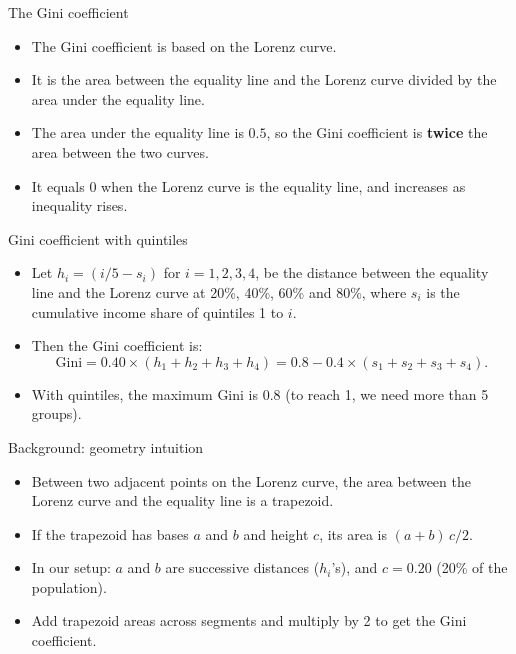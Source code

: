 \documentclass[aspectratio=169]{beamer}
\begin{document}
\begin{frame}{The Gini coefficient}
\transfade
\begin{itemize}
\item The Gini coefficient is based on the Lorenz curve.
\item It is the area between the equality line and the Lorenz curve divided by the area under the equality line.
\item The area under the equality line is $0.5$, so the Gini coefficient is \textbf{twice} the area between the two curves.
\item It equals 0 when the Lorenz curve is the equality line, and increases as inequality rises.
\end{itemize}
\end{frame}

\begin{frame}{Gini coefficient with quintiles}
\transfade
\begin{itemize}
\item Let $h_i=(i/5-s_i)$ for $i=1,2,3,4$, be the distance between the equality line and the Lorenz curve at 20\%, 40\%, 60\% and 80\%, where $s_i$ is the cumulative income share of quintiles 1 to $i$.
\item Then the Gini coefficient is:
\[
\text{Gini} = 0.40 \times (h_1+h_2+h_3+h_4) = 0.8-0.4\times(s_1+s_2+s_3+s_4).
\]
\item With quintiles, the maximum Gini is $0.8$ (to reach 1, we need more than 5 groups).
\end{itemize}
\end{frame}

\begin{frame}{Background: geometry intuition}
\transfade
\begin{itemize}
\item Between two adjacent points on the Lorenz curve, the area between the Lorenz curve and the equality line is a trapezoid.
\item If the trapezoid has bases $a$ and $b$ and height $c$, its area is $(a+b)\,c/2$.
\item In our setup: $a$ and $b$ are successive distances ($h_i$'s), and $c=0.20$ (20\% of the population).
\item Add trapezoid areas across segments and multiply by 2 to get the Gini coefficient.
\end{itemize}
\end{frame}
\end{document}

